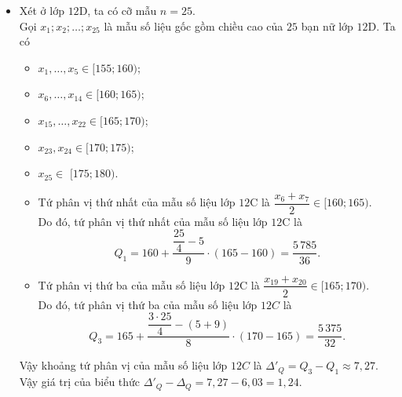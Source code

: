 \begin{ex}
{\begin{itemize}
\begin{itemize}
				Vậy khoảng tứ phân vị của mẫu số liệu lớp $12C$ là \[\Delta_Q=Q_3-Q_1=\dfrac{675}{112} \approx 6{,}03.\]
			\end{itemize}
			\item Xét ở lớp $12$D, ta có cỡ mẫu $n=25$.\\
			Gọi $x_1; x_2; \ldots; x_{25}$ là mẫu số liệu gốc gồm chiều cao của $25$ bạn nữ lớp $12$D. Ta có
			\begin{itemize}
				\item $x_1, \ldots, x_5 \in[155; 160)$; 
				\item $x_6, \ldots, x_{14} \in[160; 165)$; 
				\item $x_{15}, \ldots, x_{22} \in[165; 170)$; 
				\item $x_{23}, x_{24} \in[170; 175)$; 
				\item $x_{25} \in$ $[175; 180)$.
				\item Tứ phân vị thứ nhất của mẫu số liệu lớp $12$C là $\dfrac{x_6+x_7}{2} \in[160; 165)$.\\
				Do đó, tứ phân vị thứ nhất của mẫu số liệu lớp $12$C là
				\[Q_1=160+\dfrac{\dfrac{25}{4}-5}{9} \cdot(165-160)=\dfrac{5\,785}{36}.\]
				\item Tứ phân vị thứ ba của mẫu số liệu lớp $12$C là $\dfrac{x_{19}+x_{20}}{2} \in[165; 170)$.\\
				Do đó, tứ phân vị thứ ba của mẫu số liệu lớp $12C$ là
				\[Q_3=165+\dfrac{\dfrac{3 \cdot 25}{4}-(5+9)}{8} \cdot(170-165)=\dfrac{5\,375}{32}.\]				
			\end{itemize}
			Vậy khoảng tứ phân vị của mẫu số liệu lớp $12C$ là $\Delta'_Q=Q_3-Q_1 \approx 7{,}27$.\\
			Vậy giá trị của biểu thức $\Delta'_{Q}-\Delta_{Q}=7{,}27-6{,}03=1{,}24$.
		\end{itemize}
	}
\end{ex}
